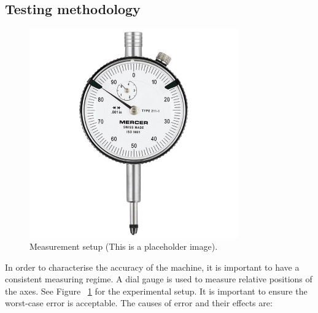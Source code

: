 


\subsection{Testing methodology}

\begin{figure}[ht!]
\centering
\includegraphics[width=90mm]{resources/dialgauge.png}
\caption{Measurement setup (This is a placeholder image).}
\label{dialgauge}
\end{figure}

In order to characterise the accuracy of the machine, it is important to have a consistent measuring regime. A dial gauge is used to measure
relative positions of the axes. See Figure ~\ref{dialgauge} for the experimental setup. It is important to ensure the worst-case error is acceptable. The causes of error and their effects are:

